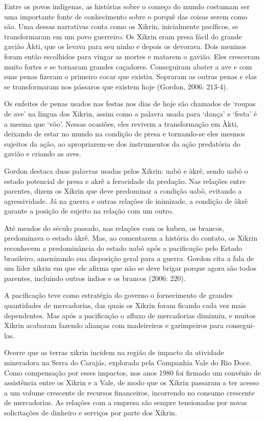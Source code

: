 Entre os povos indígenas, as histórias sobre o começo do mundo costumam
ser uma importante fonte de conhecimento sobre o porquê das coisas
serem como são. Uma dessas narrativas conta como os Xikrin,
inicialmente pacíficos, se transformaram em um povo guerreiro. Os
Xikrin eram presa fácil do grande gavião Àkti, que os levava para seu
ninho e depois os devorava. Dois meninos foram então escolhidos para
vingar as mortes e matarem o gavião. Eles cresceram muito fortes e se
tornaram grandes caçadores. Conseguiram abater a ave e com suas penas
fizeram o primeiro cocar que existiu. Sopraram as outras penas e elas
se transformaram nos pássaros que existem hoje (Gordon, 2006: 213-4). 

Os enfeites de penas usados nas festas nos dias de hoje são chamados de
‘roupas de ave’ na língua dos Xikrin, assim como a palavra usada para
‘dança’ e ‘festa’ é a mesma que ‘vôo’. Nessas ocasiões, eles revivem a
transformação em Àkti, deixando de estar no mundo na condição de presa
e tornando-se eles mesmos sujeitos da ação, ao apropriarem-se dos
instrumentos da ação predatória do gavião e criando as aves.

Gordon destaca duas palavras usadas pelos Xikrin: uabô e àkrê, sendo
uabô o estado potencial de presa e akrê a ferocidade da predação. Nas
relações entre parentes, dizem os Xikrin que deve predominar a condição
uabô, evitando a agressividade. Já na guerra e outras relações de
inimizade, a condição de àkrê garante a posição de sujeito na relação
com um outro. 

Até meados do século passado, nas relações com os kuben, os brancos,
predominava o estado àkrê. Mas, ao comentarem a história do contato, os
Xikrin reconhecem a predominância do estado uabô após a pacificação
pelo Estado brasileiro, amenizando sua disposição geral para a guerra.
Gordon cita a fala de um líder xikrin em que ele afirma que não se deve
brigar porque agora são todos parentes, incluindo outros índios e os
brancos (2006: 220). 

A pacificação teve como estratégia do governo o fornecimento de grandes
quantidades de mercadorias, das quais os Xikrin foram ficando cada vez
mais dependentes. Mas após a pacificação o afluxo de mercadorias
diminuiu, e muitos Xikrin acabaram fazendo alianças com madeireiros e
garimpeiros para consegui-las. 

Ocorre que as terras xikrin incidem na região de impacto da atividade
mineradora na Serra do Carajás, explorada pela Companhia Vale do Rio
Doce. Como compensação por esses impactos, nos anos 1980 foi firmado um
convênio de assistência entre os Xikrin e a Vale, de modo que os Xikrin
passaram a ter acesso a um volume crescente de recursos financeiros,
incorrendo no consumo crescente de mercadorias. As relações com a
empresa são sempre tensionadas por novas solicitações de dinheiro e
serviços por parte dos Xikrin. 

